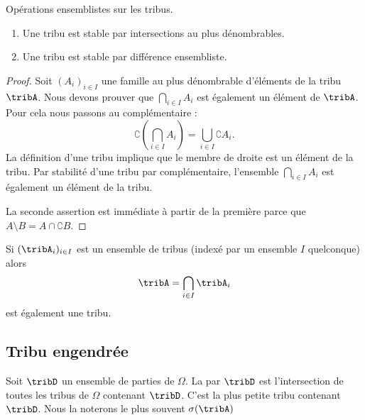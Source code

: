 \begin{lemma}   \label{LemBWNlKfA}
	Opérations ensemblistes sur les tribus.
	\begin{enumerate}
		\item       \label{ITEMooTDXNooFszBzi}
		      Une tribu est stable par intersections au plus dénombrables.
		\item       \label{ItemXQVLooFGBQNj}
		      Une tribu est stable par différence ensembliste.
	\end{enumerate}
\end{lemma}

\begin{proof}
	Soit \( (A_i)_{i\in I}\) une famille au plus dénombrable d'éléments de la tribu \( \tribA\). Nous devons prouver que \( \bigcap_{i\in I}A_i\) est également un élément de \( \tribA\). Pour cela nous passons au complémentaire :
	\begin{equation}
		\complement\left( \bigcap_{i\in I}A_i \right)=\bigcup_{i\in I}\complement A_i.
	\end{equation}
	La définition d'une tribu implique que le membre de droite est un élément de la tribu. Par stabilité d'une tribu par complémentaire, l'ensemble \( \bigcap_{i\in I}A_i\) est également un élément de la tribu.

	La seconde assertion est immédiate à partir de la première parce que \( A\setminus B=A\cap \complement B\).
\end{proof}

Si \( (\tribA_i)_{i\in I}\) est un ensemble de tribus (indexé par un ensemble \( I\) quelconque) alors
\begin{equation}
	\tribA=\bigcap_{i\in I}\tribA_i
\end{equation}
est également une tribu.

\subsection{Tribu engendrée}

\begin{definition}      \label{DEFooJSAKooSDnGzt}
	Soit \( \tribD\) un ensemble de parties de \( \Omega\). La  par \( \tribD\) est l'intersection de toutes les tribus de \( \Omega\) contenant \( \tribD\). C'est la plus petite tribu contenant \( \tribD\). Nous la noterons le plus souvent \( \sigma(\tribA)\)
\end{definition}


